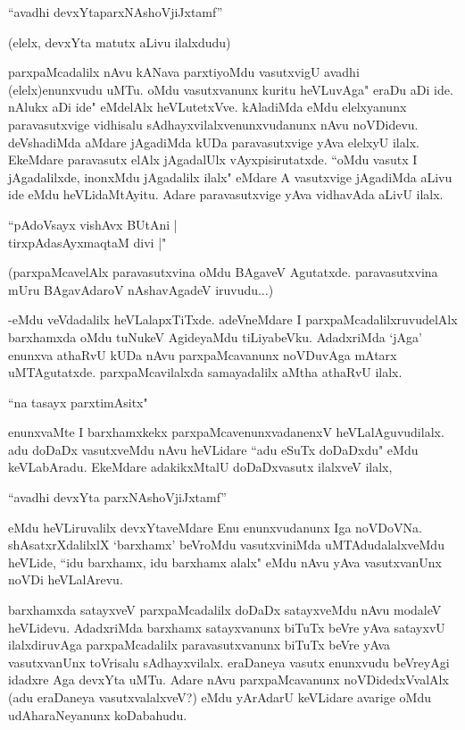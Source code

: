 \begin{shloka}
``avadhi devxYtaparxNAshoVjiJxtamf''
\end{shloka}

(elelx, devxYta matutx aLivu ilalxdudu)

parxpaMcadalilx nAvu kANava parxtiyoMdu vasutxvigU avadhi (elelx)enunxvudu uMTu. oMdu vasutxvanunx kuritu heVLuvAga" eraDu aDi ide. nAlukx aDi ide" eMdelAlx heVLutetxVve. kAladiMda eMdu elelxyanunx paravasutxvige vidhisalu sAdhayxvilalxvenunxvudanunx nAvu noVDidevu. deVshadiMda aMdare jAgadiMda kUDa paravasutxvige yAva elelxyU ilalx. EkeMdare paravasutx elAlx jAgadalUlx vAyxpisirutatxde. ``oMdu vasutx I jAgadalilxde, inonxMdu jAgadalilx ilalx" eMdare A vasutxvige jAgadiMda aLivu ide eMdu heVLidaMtAyitu. Adare paravasutxvige yAva vidhavAda aLivU ilalx.

\begin{shloka}
``pAdoV\s sayx vishAvx BUtAni |\\
tirxpAdasAyxmaqtaM divi |"
\end{shloka}
 
 (parxpaMcavelAlx paravasutxvina oMdu BAgaveV Agutatxde. paravasutxvina mUru BAgavAdaroV nAshavAgadeV iruvudu$\ldots$)
 
 
 -eMdu veVdadalilx heVLalapxTiTxde. adeVneMdare I parxpaMcadalilxruvudelAlx barxhamxda oMdu tuNukeV AgideyaMdu tiLiyabeVku. AdadxriMda `jAga' enunxva athaRvU kUDa nAvu parxpaMcavanunx noVDuvAga mAtarx uMTAgutatxde. parxpaMcavilalxda samayadalilx aMtha athaRvU ilalx.
 
 
 \begin{shloka}
 ``na tasayx parxtimA\s sitx"
\end{shloka} 

enunxvaMte I barxhamxkekx parxpaMcavenunxvadanenxV heVLalAguvudilalx. adu doDaDx vasutxveMdu nAvu heVLidare ``adu eSuTx doDaDxdu" eMdu keVLabAradu. EkeMdare adakikxMtalU doDaDxvasutx ilalxveV ilalx, 

\begin{shloka}
``avadhi devxYta parxNAshoVjiJxtamf''
\end{shloka}

\noindent eMdu heVLiruvalilx devxYtaveMdare Enu enunxvudanunx Iga noVDoVNa. shAsatxrXdalilxlX `barxhamx' beVroMdu vasutxviniMda uMTAdudalalxveMdu heVLide, ``idu barxhamx, idu barxhamx alalx" eMdu nAvu yAva vasutxvanUnx noVDi heVLalArevu. 


barxhamxda satayxveV parxpaMcadalilx doDaDx satayxveMdu nAvu modaleV heVLidevu. AdadxriMda barxhamx satayxvanunx biTuTx beVre yAva satayxvU ilalxdiruvAga parxpaMcadalilx paravasutxvanunx biTuTx beVre yAva vasutxvanUnx toVrisalu sAdhayxvilalx. eraDaneya vasutx enunxvudu beVreyAgi idadxre Aga devxYta uMTu. Adare nAvu parxpaMcavanunx noVDidedxVvalAlx (adu eraDaneya vasutxvalalxveV?) eMdu yArAdarU keVLidare avarige oMdu udAharaNeyanunx koDabahudu. 

